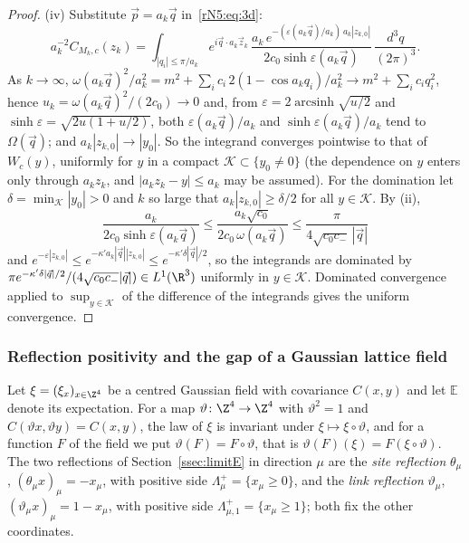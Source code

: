 \begin{proof}
(iv) Substitute $\vec p=a_k\vec q$ in~\eqref{rN5:eq:3d}:
\[
a_k^{-2}C_{M_k,c}(z_k)=\int_{|q_i|\le\pi/a_k}e^{i\vec q\cdot a_k\vec z_k}\,
\frac{a_k\,e^{-(\varepsilon(a_k\vec q)/a_k)\,a_k|z_{k,0}|}}{2c_0\sinh
\varepsilon(a_k\vec q)}\,\frac{d^3q}{(2\pi)^3}.
\]
As $k\to\infty$, $\omega(a_k\vec q)^2/a_k^2=m^2+\sum_ic_i\,2(1-\cos a_kq_i)/a_k^2
\to m^2+\sum_ic_iq_i^2$, hence $u_k=\omega(a_k\vec q)^2/(2c_0)\to0$ and, from
$\varepsilon=2\operatorname{arcsinh}\sqrt{u/2}$ and $\sinh\varepsilon=\sqrt
{2u(1+u/2)}$, both $\varepsilon(a_k\vec q)/a_k$ and $\sinh\varepsilon(a_k\vec
q)/a_k$ tend to $\Omega(\vec q)$; and $a_k|z_{k,0}|\to|y_0|$. So the integrand
converges pointwise to that of $W_c(y)$, uniformly for $y$ in a compact
$\mathcal K\subset\{y_0\ne0\}$ (the dependence on $y$ enters only through
$a_kz_k$, and $|a_kz_k-y|\le a_k$ may be assumed). For the domination let
$\delta=\min_{\mathcal K}|y_0|>0$ and $k$ so large that $a_k|z_{k,0}|\ge
\delta/2$ for all $y\in\mathcal K$. By (ii),
\[
\frac{a_k}{2c_0\sinh\varepsilon(a_k\vec q)}\le\frac{a_k\sqrt{c_0}}{2c_0\,
\omega(a_k\vec q)}\le\frac\pi{4\sqrt{c_0c_-}\,|\vec q|}
\]
and
$e^{-\varepsilon|z_{k,0}|}\le e^{-\kappa'a_k|\vec q||z_{k,0}|}\le e^{-\kappa'
\delta|\vec q|/2}$, so the integrands are dominated by $\pi e^{-\kappa'\delta
|\vec q|/2}/(4\sqrt{c_0c_-}|\vec q|)\in L^1(\R^3)$ uniformly in $y\in\mathcal
K$. Dominated convergence applied to $\sup_{y\in\mathcal K}$ of the difference
of the integrands gives the uniform convergence.
\end{proof}

\subsubsection{Reflection positivity and the gap of a Gaussian lattice field}

Let $\xi=(\xi_x)_{x\in\Z^4}$ be a centred Gaussian field with covariance
$C(x,y)$ and let $\mathbb E$ denote its expectation. For a map
$\vartheta\colon\Z^4\to\Z^4$ with $\vartheta^2=1$ and $C(\vartheta x,\vartheta
y)=C(x,y)$, the law of $\xi$ is invariant under $\xi\mapsto\xi\circ\vartheta$,
and for a function $F$ of the field we put $\vartheta(F)=F\circ\vartheta$,
that is $\vartheta(F)(\xi)=F(\xi\circ\vartheta)$. The two reflections of
Section~\ref{ssec:limitE} in direction $\mu$ are the \emph{site reflection}
$\theta_\mu$, $(\theta_\mu x)_\mu=-x_\mu$, with positive side $\Lambda^+_\mu=
\{x_\mu\ge0\}$, and the \emph{link reflection} $\vartheta_\mu$, $(\vartheta_\mu
x)_\mu=1-x_\mu$, with positive side $\Lambda^{+}_{\mu,1}=\{x_\mu\ge1\}$; both
fix the other coordinates.

